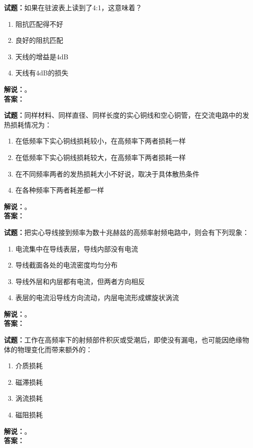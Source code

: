 \documentclass{ctexbook}
\begin{document}
\vspace{\baselineskip}

\noindent\textbf{试题：}如果在驻波表上读到了4:1，这意味着？
\begin{enumerate}[leftmargin=3em]
  \item 阻抗匹配得不好
  \item 良好的阻抗匹配
  \item 天线的增益是4dB
  \item 天线有4dB的损失
\end{enumerate}
\noindent\textbf{解说：}\textbf{}。\\\noindent\textbf{答案：}

\vspace{\baselineskip}

\noindent\textbf{试题：}同样材料、同样直径、同样长度的实心铜线和空心铜管，在交流电路中的发热损耗情况为：
\begin{enumerate}[leftmargin=3em]
  \item 在低频率下实心铜线损耗较小，在高频率下两者损耗一样
  \item 在低频率下实心铜线损耗较大，在高频率下两者损耗一样
  \item 在不同频率两者的发热损耗大小不好说，取决于具体散热条件
  \item 在各种频率下两者耗差都一样
\end{enumerate}
\noindent\textbf{解说：}\textbf{}。\\\noindent\textbf{答案：}

\vspace{\baselineskip}

\noindent\textbf{试题：}把实心导线接到频率为数十兆赫兹的高频率射频电路中，则会有下列现象：
\begin{enumerate}[leftmargin=3em]
  \item 电流集中在导线表层，导线内部没有电流
  \item 导线截面各处的电流密度均匀分布
  \item 导线外层和内层都有电流，但两者方向相反
  \item 表层的电流沿导线方向流动，内层电流形成螺旋状涡流
\end{enumerate}
\noindent\textbf{解说：}\textbf{}。\\\noindent\textbf{答案：}

\vspace{\baselineskip}

\noindent\textbf{试题：}工作在高频率下的射频部件积灰或受潮后，即使没有漏电，也可能因绝缘物体的物理变化而带来额外的：
\begin{enumerate}[leftmargin=3em]
  \item 介质损耗
  \item 磁滞损耗
  \item 涡流损耗
  \item 磁阻损耗
\end{enumerate}
\noindent\textbf{解说：}\textbf{}。\\\noindent\textbf{答案：}
\end{document}
